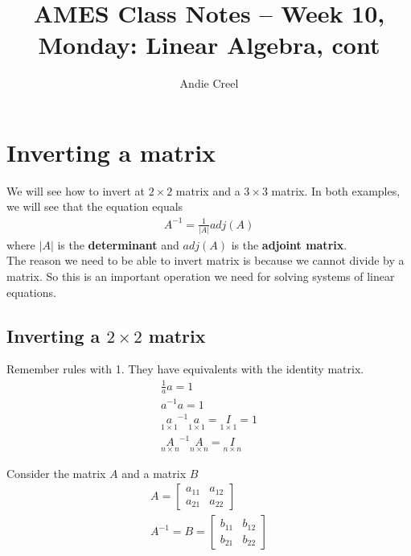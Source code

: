 \documentclass{article}
\title{AMES Class Notes -- Week 10, Monday: Linear Algebra, cont}
\author{Andie Creel}
\begin{document}
\maketitle


\section{Inverting a matrix}
We will see how to invert at $2 \times 2$ matrix and a $3 \times 3$ matrix. In both examples, we will see that the equation equals 
\begin{align}
    A^{-1} = \frac{1}{|A|} adj(A) \label{og_def}
\end{align}
where $|A|$ is the \textbf{determinant} and $adj(A)$ is the \textbf{adjoint matrix}.\\

The reason we need to be able to invert matrix is because we cannot divide by a matrix. So this is an important operation we need for solving systems of linear equations. 


\subsection{Inverting a $2 \times 2$ matrix}

Remember rules with 1. They have equivalents with the identity matrix. 
\begin{align}
    \frac{1}{a} a = 1\\
    a^{-1}a = 1 \\
    \underset{1 \times 1}a^{-1} \underset{1 \times 1}a = \underset{1 \times 1}I = 1\\
    \underset{n \times n}A^{-1} \underset{n \times n}A = \underset{n \times n}I
\end{align}

Consider the matrix $A$ and a matrix $B$ 
\begin{align}
    A = \begin{bmatrix}
        a_{11} & a_{12} \\
        a_{21} & a_{22}
    \end{bmatrix}\\
    A^{-1} = B = \begin{bmatrix}
        b_{11} & b_{12} \\
        b_{21} & b_{22}
    \end{bmatrix}
\end{align}
\end{document}
